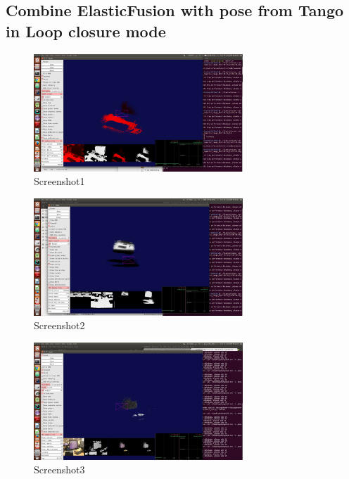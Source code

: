 \documentclass[12pt,twoside]{article}
\begin{document}
\newpage



\subsection{Combine ElasticFusion with pose from Tango in Loop closure mode}









\newpage






\begin{figure}[h]
    \centering
    \includegraphics[width=0.7\textwidth]{figures/Screenshot1}
    \caption{Screenshot1}
    \label{fig:Screenshot1}
\end{figure}

\begin{figure}[h]
    \centering
    \includegraphics[width=0.7\textwidth]{figures/Screenshot2}
    \caption{Screenshot2}
    \label{fig:Screenshot2}
\end{figure}

\begin{figure}[h]
    \centering
    \includegraphics[width=0.7\textwidth]{figures/Screenshot3}
    \caption{Screenshot3}
    \label{fig:Screenshot3}
\end{figure}
\end{document}

